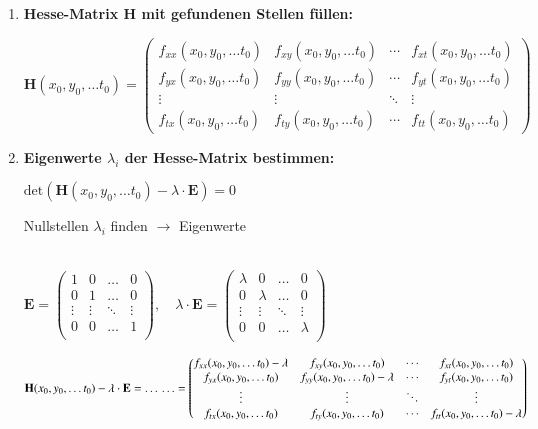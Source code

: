 \begin{enumerate}[itemsep=1ex]
    \item \textbf{Hesse-Matrix H mit gefundenen Stellen füllen:}

    $\mathbf{H}(x_0,y_0,\ldots t_0)=
    \begin{pmatrix}
        f_{xx}(x_0,y_0,\ldots t_0)&f_{xy}(x_0,y_0, \ldots t_0)&\cdots &f_{xt}(x_0,y_0,\ldots t_0)\\
        f_{yx}(x_0,y_0,\ldots t_0)&f_{yy}(x_0,y_0, \ldots t_0)&\cdots &f_{yt}(x_0,y_0,\ldots t_0)\\
        \vdots &\vdots &\ddots &\vdots \\
        f_{tx}(x_0,y_0,\ldots t_0)&f_{ty}(x_0,y_0, \ldots t_0)&\cdots &f_{tt}(x_0,y_0,\ldots t_0)\end{pmatrix}$

    \item \textbf{Eigenwerte $\lambda_i$ der Hesse-Matrix bestimmen:}

    $\text{det}\left(\mathbf{H}(x_0,y_0,\ldots t_0) - \lambda \cdot \mathbf{E}\right)  = 0$

    Nullstellen $\lambda_i$ finden $\rightarrow  $ Eigenwerte

    \medskip
    \\
    $\mathbf{E} = \begin{pmatrix}
        1&0&\ldots &0\\
        0&1&\ldots&0\\
        \vdots &\vdots &\ddots &\vdots \\
        0&0&\ldots&1\\
    \end{pmatrix}
    , \quad
    \lambda \cdot \mathbf{E} = \begin{pmatrix}
        \lambda&0&\ldots &0\\
        0&\lambda&\ldots&0\\
        \vdots &\vdots &\ddots &\vdots \\
        0&0&\ldots&\lambda\\
    \end{pmatrix}$

    \medskip
    $\mathbf{H}(x_0,y_0,\ldots t_0) - \lambda \cdot \mathbf{E} = \ldots \\
    \ldots  = 
    \begin{pmatrix}
        f_{xx}(x_0,y_0,\ldots t_0)- \lambda&f_{xy}(x_0,y_0, \ldots t_0)&\cdots &f_{xt}(x_0,y_0,\ldots t_0)\\
        f_{yx}(x_0,y_0,\ldots t_0)&f_{yy}(x_0,y_0, \ldots t_0)- \lambda&\cdots &f_{yt}(x_0,y_0,\ldots t_0)\\
        \vdots &\vdots &\ddots &\vdots \\
        f_{tx}(x_0,y_0,\ldots t_0)&f_{ty}(x_0,y_0, \ldots t_0)&\cdots &f_{tt}(x_0,y_0,\ldots t_0)- \lambda\end{pmatrix}$


\end{enumerate}

